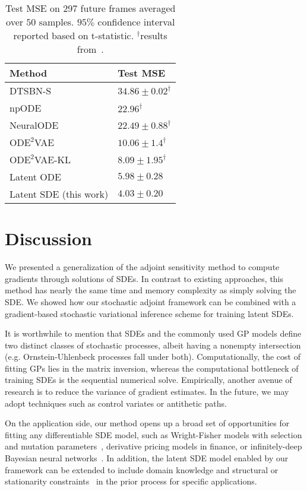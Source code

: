 \documentclass[twoside]{article}
\begin{document}
\begin{table}[h]
\caption{Test MSE on 297 future frames averaged over $50$ samples. $95\%$ confidence interval reported based on t-statistic. $^\dagger$results from~\cite{yildiz2019ode}.
}
\label{tab:mocap_results}
\centering
 \begin{tabular}{l l} 
 \midrule
 Method
 & Test MSE \\
 \midrule
 DTSBN-S~\cite{gan2015deep} & $34.86 \pm 0.02^\dagger$  \\
 {np}ODE~\cite{heinonen2018learning} & $22.96^\dagger$ \\
 {Neural}ODE~\cite{chen2018neural} &  $22.49 \pm 0.88^\dagger$ \\
 $\text{ODE}^2$VAE~\cite{yildiz2019ode} & $10.06 \pm 1.4^\dagger$ \\
 $\text{ODE}^2$VAE-KL~\cite{yildiz2019ode} & $8.09 \pm 1.95^\dagger$\\
 Latent ODE~\cite{chen2018neural,rubanova2019latent} & $5.98 \pm 0.28$ \\
 Latent SDE (this work) & $\mathbf{4.03 \pm 0.20}$ \\
 \midrule
 \end{tabular}
\end{table}
 



\section{Discussion}
We presented a generalization of the adjoint sensitivity method to compute gradients through solutions of SDEs. 
In contrast to existing approaches, this method has nearly the same time and memory complexity as simply solving the SDE.
We showed how our stochastic adjoint framework can be combined with a gradient-based stochastic variational inference scheme for training latent SDEs.

It is worthwhile to mention that SDEs and the commonly used GP models define two distinct classes of stochastic processes, albeit having a nonempty intersection (e.g. Ornstein-Uhlenbeck processes fall under both).
Computationally, the cost of fitting GPs lies in the matrix inversion, whereas the computational bottleneck of training SDEs is the sequential numerical solve. 
Empirically, another avenue of research is to reduce the variance of gradient estimates.
In the future, we may adopt techniques such as control variates or antithetic paths.


On the application side, our method opens up a broad set of opportunities for fitting any differentiable SDE model, such as Wright-Fisher models with selection and mutation parameters~\cite{ewens2012mathematical}, derivative pricing models in finance, or infinitely-deep Bayesian neural networks~\cite{neuralSDEBNN}.
In addition, the latent SDE model enabled by our framework can be extended to include domain knowledge and structural or stationarity constraints~\cite{ma2015complete} in the prior process for specific applications. 
\end{document}
